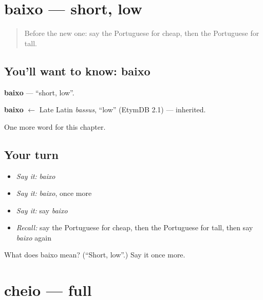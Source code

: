 \section[baixo]{baixo — short, low}

\label{lesson:PT-C67-baixo}



\begin{quote}
Before the new one: say the Portuguese for cheap, then the Portuguese for tall.
\end{quote}

\subsection*{You'll want to know: baixo}
\textbf{baixo} — \textquotedblleft{}short, low\textquotedblright{}.

\begin{cousinweb}
\textbf{baixo} $\leftarrow$ Late Latin \emph{bassus}, \textquotedblleft{}low\textquotedblright{} (EtymDB 2.1) — inherited.
\end{cousinweb}

\begin{grammarlens}[title={What you've built}]
One more word for this chapter.
\end{grammarlens}

\subsection*{Your turn}
\begin{itemize}
\raggedright
  \item \emph{Say it:} \emph{baixo}
  \item \emph{Say it:} \emph{baixo}, once more
  \item \emph{Say it:} say \emph{baixo}
  \item \emph{Recall:} say the Portuguese for cheap, then the Portuguese for tall, then say \emph{baixo} again
\end{itemize}

\begin{tcolorbox}[breakable,colback=teal!4,colframe=teal!35!black,title={Before you move on}]
What does baixo mean? (\textquotedblleft{}Short, low\textquotedblright{}.) Say it once more.
\end{tcolorbox}
\section[cheio]{cheio — full}

